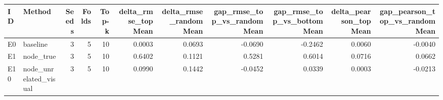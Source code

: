 \begin{tabular}{llrrrrrrrrr}
\toprule
ID & Method & Seeds & Folds & Top-k & delta_rmse_top Mean & delta_rmse_random Mean & gap_rmse_top_vs_random Mean & gap_rmse_top_vs_bottom Mean & delta_pearson_top Mean & gap_pearson_top_vs_random Mean \\
\midrule
E0 & baseline & 3 & 5 & 10 & 0.0003 & 0.0693 & -0.0690 & -0.2462 & 0.0060 & -0.0040 \\
E1 & node_true & 3 & 5 & 10 & 0.6402 & 0.1121 & 0.5281 & 0.6014 & 0.0716 & 0.0662 \\
E10 & node_unrelated_visual & 3 & 5 & 10 & 0.0990 & 0.1442 & -0.0452 & 0.0339 & 0.0003 & -0.0213 \\
\bottomrule
\end{tabular}
